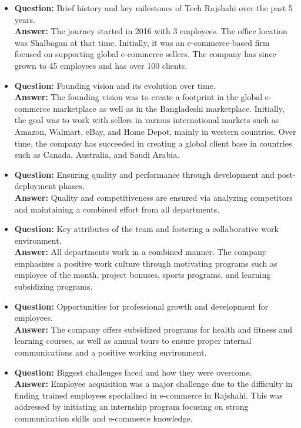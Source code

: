 \documentclass[12pt,a4paper]{article}
\begin{document}
\vspace{0.3cm}

\begin{itemize}
    \item \textbf{Question:} Brief history and key milestones of Tech Rajshahi over the past 5 years.\\
    \textbf{Answer:} The journey started in 2016 with 3 employees. The office location was Shalbagan at that time. Initially, it was an e-commerce-based firm focused on supporting global e-commerce sellers. The company has since grown to 45 employees and has over 100 clients.

    \item \textbf{Question:} Founding vision and its evolution over time.\\
    \textbf{Answer:} The founding vision was to create a footprint in the global e-commerce marketplace as well as in the Bangladeshi marketplace. Initially, the goal was to work with sellers in various international markets such as Amazon, Walmart, eBay, and Home Depot, mainly in western countries. Over time, the company has succeeded in creating a global client base in countries such as Canada, Australia, and Saudi Arabia.

    \item \textbf{Question:} Ensuring quality and performance through development and post-deployment phases.\\
    \textbf{Answer:} Quality and competitiveness are ensured via analyzing competitors and maintaining a combined effort from all departments.

    \item \textbf{Question:} Key attributes of the team and fostering a collaborative work environment.\\
    \textbf{Answer:} All departments work in a combined manner. The company emphasizes a positive work culture through motivating programs such as employee of the month, project bonuses, sports programs, and learning subsidizing programs.

    \item \textbf{Question:} Opportunities for professional growth and development for employees.\\
    \textbf{Answer:} The company offers subsidized programs for health and fitness and learning courses, as well as annual tours to ensure proper internal communications and a positive working environment.

    \item \textbf{Question:} Biggest challenges faced and how they were overcome.\\
    \textbf{Answer:} Employee acquisition was a major challenge due to the difficulty in finding trained employees specialized in e-commerce in Rajshahi. This was addressed by initiating an internship program focusing on strong communication skills and e-commerce knowledge.


\end{itemize}
\end{document}
